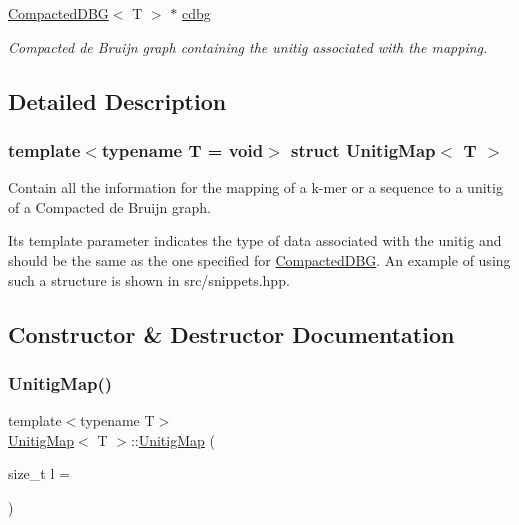 \begin{DoxyCompactItemize}
\mbox{\label{structUnitigMap_ad0fc74561ca34122241b422b10509c34}} 
\hyperlink{classCompactedDBG}{Compacted\+D\+BG}$<$ T $>$ $\ast$ \hyperlink{structUnitigMap_ad0fc74561ca34122241b422b10509c34}{cdbg}
\begin{DoxyCompactList}\small\item\em Compacted de Bruijn graph containing the unitig associated with the mapping. \end{DoxyCompactList}\end{DoxyCompactItemize}


\subsection{Detailed Description}
\subsubsection*{template$<$typename T = void$>$\newline
struct Unitig\+Map$<$ T $>$}

Contain all the information for the mapping of a k-\/mer or a sequence to a unitig of a Compacted de Bruijn graph. 

Its template parameter indicates the type of data associated with the unitig and should be the same as the one specified for \hyperlink{classCompactedDBG}{Compacted\+D\+BG}. An example of using such a structure is shown in src/snippets.\+hpp. 

\subsection{Constructor \& Destructor Documentation}
\mbox{\label{structUnitigMap_a92f76aa50f372b1f251850509958cc55}} 
\subsubsection{\texorpdfstring{Unitig\+Map()}{UnitigMap()}}
{\footnotesize\ttfamily template$<$typename T$>$ \\
\hyperlink{structUnitigMap}{Unitig\+Map}$<$ T $>$\+::\hyperlink{structUnitigMap}{Unitig\+Map} (\begin{DoxyParamCaption}\item[{size\+\_\+t}]{l = {} }\end{DoxyParamCaption})}



